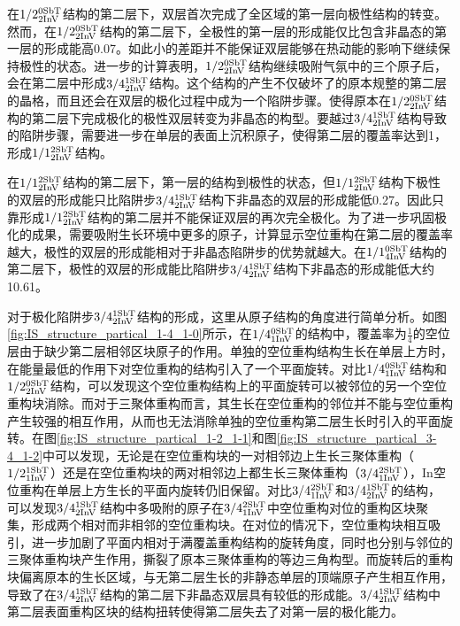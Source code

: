 在$\rm 1/2{}_{2InV}^{0SbT} \it$结构的第二层下，双层首次完成了全区域的第一层向极性结构的转变。然而，在$\rm 1/2{}_{2InV}^{0SbT} \it$结构的第二层下，全极性的第一层的形成能仅比包含非晶态的第一层的形成能高\SI{0.07}{\mievpas}。如此小的差距并不能保证双层能够在热动能的影响下继续保持极性的状态。进一步的计算表明，$\rm 1/2{}_{2InV}^{0SbT} \it$结构继续吸附气氛中的三个原子后，会在第二层中形成$\rm 3/4{}_{2InV}^{1SbT} \it$结构。这个结构的产生不仅破坏了的原本规整的第二层的晶格，而且还会在双层的极化过程中成为一个陷阱步骤。使得原本在$\rm 1/2{}_{2InV}^{0SbT} \it$结构的第二层下完成极化的极性双层转变为非晶态的构型。要越过$\rm 3/4{}_{2InV}^{1SbT} \it$结构导致的陷阱步骤，需要进一步在单层的表面上沉积原子，使得第二层的覆盖率达到1，形成$\rm 1/1{}_{2InV}^{2SbT} \it$结构。

在$\rm 1/1{}_{2InV}^{2SbT} \it$结构的第二层下，第一层的结构到极性的状态，但$\rm 1/1{}_{2InV}^{2SbT} \it$结构下极性的双层的形成能只比陷阱步$\rm 3/4{}_{2InV}^{1SbT} \it$结构下非晶态的双层的形成能低\SI{0.27}{\mievpas}。因此只靠形成$\rm 1/1{}_{2InV}^{2SbT} \it$结构的第二层并不能保证双层的再次完全极化。为了进一步巩固极化的成果，需要吸附生长环境中更多的原子，计算显示空位重构在第二层的覆盖率越大，极性的双层的形成能相对于非晶态陷阱步的优势就越大。在$\rm 1/1{}_{4InV}^{0SbT} \it$结构的第二层下，极性的双层的形成能比陷阱步$\rm 3/4{}_{2InV}^{1SbT} \it$结构下非晶态的形成能低大约\SI{10.61}{\mievpas}。

对于极化陷阱步$\rm 3/4{}_{2InV}^{1SbT} \it$结构的形成，这里从原子结构的角度进行简单分析。如图\ref{fig:IS_structure_partical_1-4_1-0}所示，在$\rm 1/4{}_{1InV}^{0SbT} \it$的结构中，覆盖率为$\frac{1}{4}$的空位层由于缺少第二层相邻区块原子的作用。单独的空位重构结构生长在单层上方时，在能量最低的作用下对空位重构的结构引入了一个平面旋转。对比$\rm 1/4{}_{1InV}^{0SbT} \it$结构和$\rm 1/2{}_{2InV}^{0SbT} \it$结构，可以发现这个空位重构结构上的平面旋转可以被邻位的另一个空位重构块消除。而对于三聚体重构而言，其生长在空位重构的邻位并不能与空位重构产生较强的相互作用，从而也无法消除单独的空位重构第二层生长时引入的平面旋转。在图\ref{fig:IS_structure_partical_1-2_1-1}和图\ref{fig:IS_structure_partical_3-4_1-2}中可以发现，无论是在空位重构块的一对相邻边上生长三聚体重构（$\rm 1/2{}_{1InV}^{1SbT} \it$）还是在空位重构块的两对相邻边上都生长三聚体重构（$\rm 3/4{}_{1InV}^{2SbT} \it$），{In}空位重构在单层上方生长的平面内旋转仍旧保留。对比$\rm 3/4{}_{1InV}^{2SbT} \it$和$\rm 3/4{}_{2InV}^{1SbT} \it$的结构，可以发现$\rm 3/4{}_{2InV}^{1SbT} \it$结构中多吸附的原子在$\rm 3/4{}_{1InV}^{2SbT} \it$中空位重构对位的重构区块聚集，形成两个相对而非相邻的空位重构块。在对位的情况下，空位重构块相互吸引，进一步加剧了平面内相对于满覆盖重构结构的旋转角度，同时也分别与邻位的三聚体重构块产生作用，撕裂了原本三聚体重构的等边三角构型。而旋转后的重构块偏离原本的生长区域，与无第二层生长的非静态单层的顶端原子产生相互作用，导致了在$\rm 3/4{}_{2InV}^{1SbT} \it$结构的第二层下非晶态双层具有较低的形成能。$\rm 3/4{}_{2InV}^{1SbT} \it$结构中第二层表面重构区块的结构扭转使得第二层失去了对第一层的极化能力。


